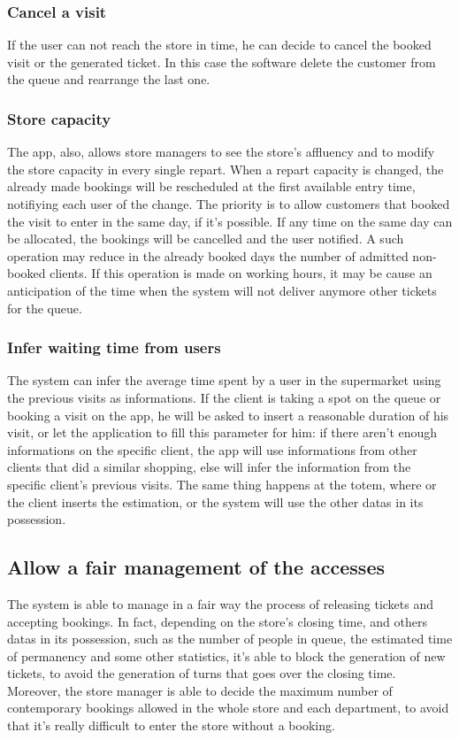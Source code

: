 \documentclass{article}
\begin{document}
		\subsubsection{Cancel a visit}
		
		If the user can not reach the store in time, he can decide to cancel the booked visit or the generated ticket. In this case the software delete the customer from the queue and rearrange the last one.
		
		\subsubsection{Store capacity}
		
		The app, also, allows store managers to see the store's affluency and to modify the store capacity in every single repart. When a repart capacity is changed, the already made bookings will be rescheduled at the first available entry time, notifiying each user of the change. The priority is to allow customers that booked the visit to enter in the same day, if it's possible. If any time on the same day can be allocated, the bookings will be cancelled and the user notified. A such operation may reduce in the already booked days the number of admitted non-booked clients. If this operation is made on working hours, it may be cause an anticipation of the time when the system will not deliver anymore other tickets for the queue.
		
		\subsubsection{Infer waiting time from users}
		
		The system can infer the average time spent by a user in the supermarket using the previous visits as informations. If the client is taking a spot on the queue or booking a visit on the app, he will be asked to insert a reasonable duration of his visit, or let the application to fill this parameter for him: if there aren't enough informations on the specific client, the app will use informations from other clients that did a similar shopping, else will infer the information from the specific client's previous visits. The same thing happens at the totem, where or the client inserts the estimation, or the system will use the other datas in its possession.  \\
		
		\subsection{Allow a fair management of the accesses}
		The system is able to manage in a fair way the process of releasing tickets and accepting bookings. In fact, depending on the store's closing time, and others datas in its possession, such as the number of people in queue, the estimated time of permanency and some other statistics, it's able to block the generation of new tickets, to avoid the generation of turns that goes over the closing time. Moreover, the store manager is able to decide the maximum number of contemporary bookings allowed in the whole store and each department, to avoid that it's really difficult to enter the store without a booking.
\end{document}
